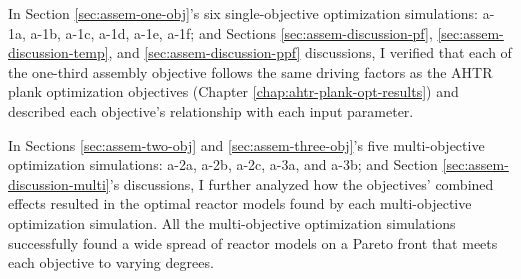 In Section \ref{sec:assem-one-obj}'s six single-objective optimization simulations: 
a-1a, a-1b, a-1c, a-1d, a-1e, a-1f; and Sections \ref{sec:assem-discussion-pf}, 
\ref{sec:assem-discussion-temp}, and \ref{sec:assem-discussion-ppf} discussions,    
I verified that each of the one-third assembly objective follows the same driving 
factors as the \gls{AHTR} plank optimization objectives (Chapter 
\ref{chap:ahtr-plank-opt-results}) and described each objective's relationship with 
each input parameter. 

In Sections \ref{sec:assem-two-obj} and \ref{sec:assem-three-obj}'s five multi-objective 
optimization simulations: a-2a, a-2b, a-2c, a-3a, and a-3b; and Section 
\ref{sec:assem-discussion-multi}'s discussions, I further analyzed how the objectives' 
combined effects resulted in the optimal reactor models found by each multi-objective 
optimization simulation. 
All the multi-objective optimization simulations successfully found a wide spread of 
reactor models on a Pareto front that meets each objective to varying degrees. 

